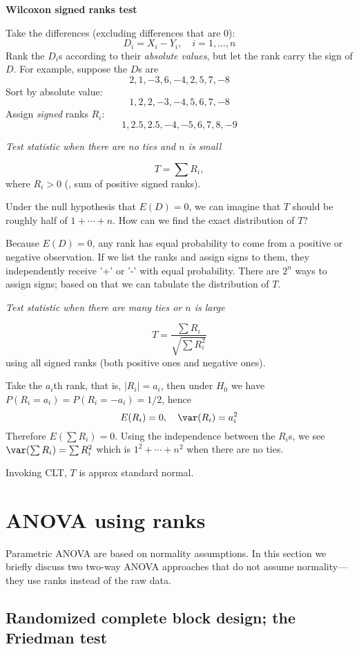 \documentclass[12pt]{article}
\begin{document}
\textbf{Wilcoxon signed ranks test}

Take the differences (excluding differences that are 0):
\[
D_i = X_i - Y_i,
\quad i=1,\dotsc,n
\]
Rank the $D_i$s according to their \emph{absolute values}, but let the
rank carry the sign of $D$. For example, suppose the $D$s are
\[
2, 1, -3, 6, -4, 2, 5, 7, -8
\]
Sort by absolute value:
\[
1, 2, 2, -3, -4, 5, 6, 7, -8
\]
Assign \emph{signed} ranks $R_i$:
\[
1, 2.5, 2.5, -4, -5, 6, 7, 8, -9
\]

\emph{Test statistic when there are no ties and $n$ is small}

\[
T = \sum R_i,
\]
where $R_i > 0$ (\ie, sum of positive signed ranks).

Under the null hypothesis that $E(D) = 0$,
we can imagine that $T$ should be roughly half of
$1+\dotsb+n$.
How can we find the exact distribution of $T$?

Because $E(D) = 0$, any rank has equal probability to come from a
positive or negative observation. If we list the ranks and assign signs
to them, they independently receive '+' or '-' with equal probability.
There are $2^n$ ways to assign signs; based on that we can tabulate the
distribution of $T$.

\emph{Test statistic when there are many ties or $n$ is large}

\[
T = \frac{\sum R_i}{\sqrt{\sum R_i^2}}
\]
using all signed ranks (both positive ones and negative ones).

Take the $a_i$th rank, that is,
$|R_i| = a_i$, then under $H_0$ we have
$P(R_i = a_i) = P(R_i = -a_i) = 1/2$,
hence
\[
E(R_i) = 0,\quad \var(R_i) = a_i^2
\]
Therefore $E(\sum R_i) = 0$.
Using the independence between the $R_i$s,
we see $\var(\sum R_i) = \sum R_i^2$
which is $1^2 +\dotsb +n^2$ when there are no ties.

Invoking CLT, $T$ is approx standard normal.


\section{ANOVA using ranks}

Parametric ANOVA are based on normality assumptions.
In this section we briefly discuss two two-way ANOVA approaches
that do not assume normality---they use ranks instead of the raw data.

\subsection{Randomized complete block design; the Friedman test}
\end{document}
